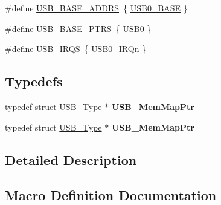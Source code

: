 \begin{DoxyCompactItemize}
\item 
\#define \hyperlink{group__USB__Peripheral__Access__Layer_gac3fe38a7a5a01a7da6dfcc4a06f4f721}{U\+S\+B\+\_\+\+B\+A\+S\+E\+\_\+\+A\+D\+D\+RS}~\{ \hyperlink{group__USB__Peripheral__Access__Layer_gaa47acf4992407a85e79d911ca1055d17}{U\+S\+B0\+\_\+\+B\+A\+SE} \}
\item 
\#define \hyperlink{group__USB__Peripheral__Access__Layer_gabb481a231c7c57907377d7ee985f826c}{U\+S\+B\+\_\+\+B\+A\+S\+E\+\_\+\+P\+T\+RS}~\{ \hyperlink{group__USB__Peripheral__Access__Layer_gaea56c015ce8ad0cc88464060fde6d87c}{U\+S\+B0} \}
\item 
\#define \hyperlink{group__USB__Peripheral__Access__Layer_ga17e92a5c4b8217467adbbc5ab517c72f}{U\+S\+B\+\_\+\+I\+R\+QS}~\{ \hyperlink{group__Interrupt__vector__numbers_gga666eb0caeb12ec0e281415592ae89083ad85ea858fda8e15398b5aa74c019cb7a}{U\+S\+B0\+\_\+\+I\+R\+Qn} \}
\end{DoxyCompactItemize}
\subsection*{Typedefs}
\begin{DoxyCompactItemize}
\item 
typedef struct \hyperlink{structUSB__Type}{U\+S\+B\+\_\+\+Type} $\ast$ {\bfseries U\+S\+B\+\_\+\+Mem\+Map\+Ptr}\hypertarget{group__USB__Peripheral__Access__Layer_ga4ab4b0ab333d718cb18197e03772f425}{}\label{group__USB__Peripheral__Access__Layer_ga4ab4b0ab333d718cb18197e03772f425}

\item 
typedef struct \hyperlink{structUSB__Type}{U\+S\+B\+\_\+\+Type} $\ast$ {\bfseries U\+S\+B\+\_\+\+Mem\+Map\+Ptr}\hypertarget{group__USB__Peripheral__Access__Layer_ga4ab4b0ab333d718cb18197e03772f425}{}\label{group__USB__Peripheral__Access__Layer_ga4ab4b0ab333d718cb18197e03772f425}

\end{DoxyCompactItemize}


\subsection{Detailed Description}


\subsection{Macro Definition Documentation}
